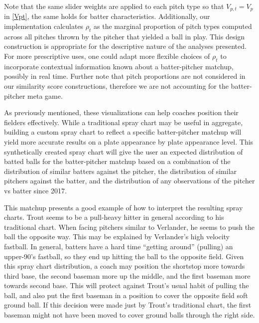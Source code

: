 \documentclass[12pt]{article}
\begin{document}
Note that the same slider weights are applied to each pitch type so that $V_{p,t} = V_p$ in \eqref{Vpt}, the same holds for batter characteristics. Additionally, our implementation calculates $\rho_t$ as the marginal proportion of pitch types computed across all pitches thrown by the pitcher that yielded a ball in play. This design construction is appropriate for the descriptive nature of the analyses presented. For more prescriptive uses, one could adapt more flexible choices of $\rho_t$ to incorporate contextual information known about a batter-pitcher matchup, possibly in real time. Further note that pitch proportions are not considered in our similarity score constructions, therefore we are not accounting for the batter-pitcher meta game.


As previously mentioned, these visualizations can help coaches position their fielders effectively. While a traditional spray chart may be useful in aggregate, building a custom spray chart to reflect a specific batter-pitcher matchup will yield more accurate results on a plate appearance by plate appearance level. This synthetically created spray chart will give the user an expected distribution of batted balls for the batter-pitcher matchup based on a combination of the distribution of similar batters against the pitcher, the distribution of similar pitchers against the batter, and the distribution of any observations of the pitcher vs batter since 2017. 

This matchup presents a good example of how to interpret the resulting spray charts. Trout seems to be a pull-heavy hitter in general according to his traditional chart. When facing pitchers similar to Verlander, he seems to push the ball the opposite way. This may be explained by Verlander's high velocity fastball. In general, batters have a hard time ``getting around'' (pulling) an upper-90's fastball, so they end up hitting the ball to the opposite field. Given this spray chart distribution, a coach may position the shortstop more towards third base, the second baseman more up the middle, and the first baseman more towards second base. This will protect against Trout's usual habit of pulling the ball, and also put the first baseman in a position to cover the opposite field soft ground ball. If this decision were made just by Trout's traditional chart, the first baseman might not have been moved to cover ground balls through the right side.
\end{document}
